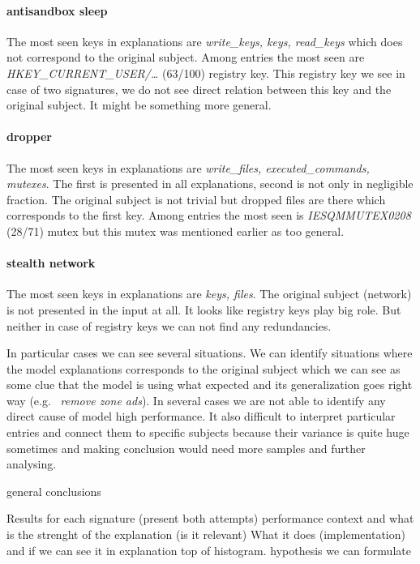 \paragraph{antisandbox sleep}
The most seen keys in explanations are \emph{write_keys, keys, read_keys} which does not correspond to the original subject. Among entries the most seen are \emph{HKEY_CURRENT_USER/\dots} (63/100) registry key. This registry key we see in case of two signatures, we do not see direct relation between this key and the original subject. It might be something more general.

\paragraph{dropper}
The most seen keys in explanations are \emph{write_files, executed_commands, mutexes}. The first is presented in all explanations, second is not only in negligible fraction. The original subject is not trivial but dropped files are there which corresponds to the first key. Among entries the most seen is \emph{IESQMMUTEX0208} (28/71) mutex but this mutex was mentioned earlier as too general.

\paragraph{stealth network}
The most seen keys in explanations are \emph{keys, files}. The original subject (network) is not presented in the input at all. It looks like registry keys play big role. But neither in case of registry keys we can not find any redundancies.

In particular cases we can see several situations. We can identify situations where the model explanations corresponds to the original subject which we can see as some clue that the model is using what expected and its generalization goes right way (e.g. \ \emph{remove zone ads}). In several cases we are not able to identify any direct cause of model high performance. It also difficult to interpret particular entries and connect them to specific subjects because their variance is quite huge sometimes and making conclusion would need more samples and further analysing.


general conclusions

Results for each signature (present both attempts)
performance context and what is the strenght of the explanation (is it relevant)
What it does (implementation) and if we can see it in explanation
top of histogram.
hypothesis we can formulate

